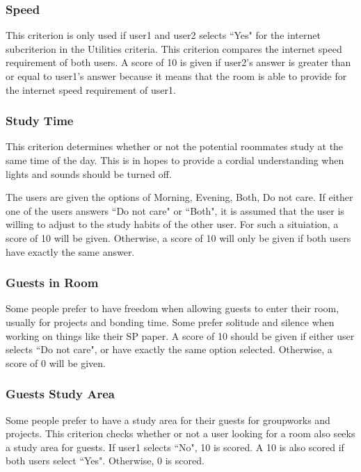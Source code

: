 \documentclass[journal]{./IEEE/IEEEtran}
\begin{document}
    \subsubsection{Speed}
        This criterion is only used if user1 and user2 selects ``Yes" for the internet subcriterion in the
        Utilities criteria. This criterion compares the internet speed requirement of both users. A score of 10 is
        given if user2's answer is greater than or equal to user1's answer because it means that the room is able to
        provide for the internet speed requirement of user1.

    \subsubsection{Study Time}
        This criterion determines whether or not the potential roommates study at the same time of the day. This is in
        hopes to provide a cordial understanding when lights and sounds should be turned off.

        The users are given the options of Morning, Evening, Both, Do not care. If either one of the users answers ``Do
        not care" or ``Both", it is assumed that the user is willing to adjust to the study habits of the other user. For such a
        situiation, a score of 10 will be given. Otherwise, a score of 10 will only be given if both users have exactly
        the same answer.

    \subsubsection{Guests in Room}
        Some people prefer to have freedom when allowing guests to enter their room, usually for projects and bonding
        time. Some prefer solitude and silence when working on things like their SP paper. A score of 10 should be given
        if either user selects ``Do not care", or have exactly the same option selected. Otherwise, a score of 0 will be
        given.

    \subsubsection{Guests Study Area}
        Some people prefer to have a study area for their guests for groupworks and projects. This criterion checks
        whether or not a user looking for a room also seeks a study area for guests. If user1 selects ``No", 10 is
        scored. A 10 is also scored if both users select ``Yes". Otherwise, 0 is scored.
\end{document}
